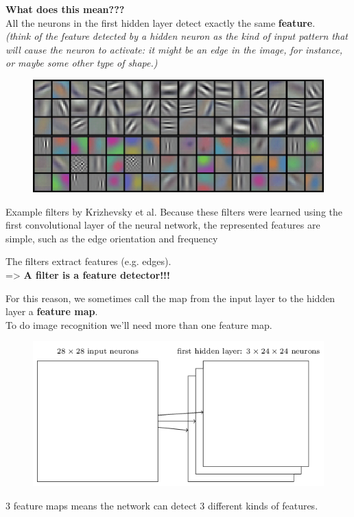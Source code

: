 \documentclass[10pt, compress]{beamer}
\begin{document}
\begin{frame}
  \vspace{0.6cm}
  \textbf{What does this mean???} \\ \hfill \break
  All the neurons in the first hidden layer detect exactly the same \textbf{feature}. \\
  \textit{(think of the feature detected by a hidden neuron as the kind of input pattern that will cause the neuron to activate: it might be an edge in the image, for instance, or maybe some other type of shape.)}
  \begin{figure}
    \includegraphics[width=.6\linewidth]{imgs/cnn/example_filters}
  \end{figure}
  \small Example filters by Krizhevsky et al. Because these filters were learned using the first convolutional layer of the neural network, the represented features are simple, such as the edge orientation and frequency

\end{frame}

\begin{frame}
  \vspace{0.6cm}
  The filters extract features (e.g. edges). \\
  => \textbf{A filter is a feature detector!!!}

  For this reason, we sometimes call the map from the input layer to the hidden layer a \textbf{feature map}. \\

  To do image recognition we'll need more than one feature map. \\
  \begin{figure}
    \includegraphics[width=.6\linewidth]{imgs/cnn/cnn_4}
  \end{figure}

  3 feature maps means the network can detect 3 different kinds of features.
\end{frame}
\end{document}
